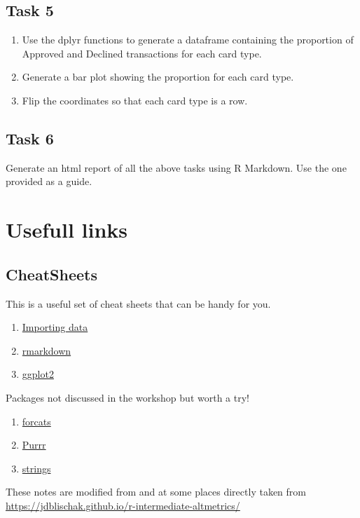 \documentclass[
]{book}
\providecommand{\tightlist}{%
  \setlength{\itemsep}{0pt}\setlength{\parskip}{0pt}}
\begin{document}
\hypertarget{task-5}{%
\section{Task 5}\label{task-5}}

\begin{enumerate}
\def\labelenumi{\arabic{enumi}.}
\tightlist
\item
  Use the dplyr functions to generate a dataframe containing the proportion of Approved and Declined transactions for each card type.
\item
  Generate a bar plot showing the proportion for each card type.
\item
  Flip the coordinates so that each card type is a row.
\end{enumerate}

\hypertarget{task-6}{%
\section{Task 6}\label{task-6}}

Generate an html report of all the above tasks using R Markdown. Use the one provided as a guide.

\hypertarget{usefull-links}{%
\chapter{Usefull links}\label{usefull-links}}

\hypertarget{cheatsheets}{%
\section{CheatSheets}\label{cheatsheets}}

This is a useful set of cheat sheets that can be handy for you.

\begin{enumerate}
\def\labelenumi{\arabic{enumi}.}
\tightlist
\item
  \href{img/data-import.pdf}{Importing data}
\item
  \href{img/rmarkdown-2.0.pdf}{rmarkdown}
\item
  \href{img/ggplot2-cheatsheet.pdf}{ggplot2}
\end{enumerate}

Packages not discussed in the workshop but worth a try!

\begin{enumerate}
\def\labelenumi{\arabic{enumi}.}
\tightlist
\item
  \href{img/factors.pdf}{forcats}
\item
  \href{img/purrr.pdf}{Purrr}
\item
  \href{img/strings.pdf}{strings}
\end{enumerate}

These notes are modified from and at some places directly taken from \url{https://jdblischak.github.io/r-intermediate-altmetrics/}

  
\end{document}
